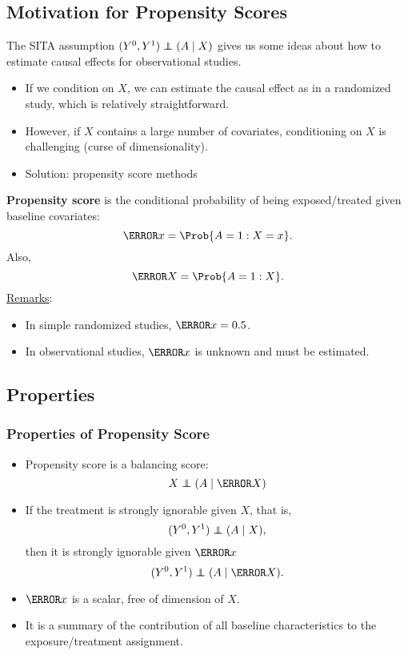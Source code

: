 \subsection*{Motivation for Propensity Scores}
The SITA assumption $(Y^0,Y^1)\indep (A\mid X)$ gives us some ideas about how to
estimate causal effects for observational studies.
\begin{itemize}
    \item If we condition on $X$, we can estimate the causal effect as in a
          randomized study, which is relatively straightforward.
    \item  However, if $X$ contains a large number of covariates,
          conditioning on $X$ is challenging (curse of dimensionality).
    \item  Solution: propensity score methods
\end{itemize}
\begin{Regular}{}
    \textbf{Propensity score} is the conditional probability of being exposed/treated given baseline covariates:
    \[ \ps{x}=\Prob{A=1\given X=x}. \]
    Also,
    \[ \ps{X}=\Prob{A=1\given X}. \]
    \tcblower{}
    \underline{Remarks}:
    \begin{itemize}
        \item In simple randomized studies, $ \ps{x}=0.5 $.
        \item In observational studies, $ \ps{x} $ is unknown and must be estimated.
    \end{itemize}
\end{Regular}
\subsection*{Properties}
\subsubsection*{Properties of Propensity Score}
\begin{itemize}
    \item Propensity score is a balancing score:
          \[ X\indep (A\mid \ps{X}) \]
    \item If the treatment is strongly ignorable given $ X $, that is,
          \[ (Y^0,Y^1)\indep (A\mid X), \]
          then it is strongly ignorable given $ \ps{x} $
          \[ (Y^0,Y^1)\indep (A\mid \ps{X}). \]
    \item $ \ps{x} $ is a scalar, free of dimension of $ X $.
    \item It is a summary of the contribution of all baseline characteristics to the exposure/treatment assignment.
\end{itemize}
